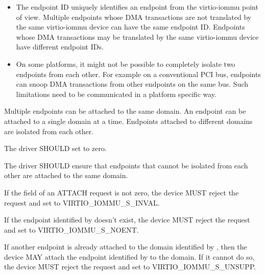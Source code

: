 \begin{itemize}
\item The endpoint ID uniquely identifies an endpoint from the
  virtio-iommu point of view. Multiple endpoints whose DMA transactions
  are not translated by the same virtio-iommu device can have the same
  endpoint ID. Endpoints whose DMA transactions may be translated by the
  same virtio-iommu device have different endpoint IDs.

\item On some platforms, it might not be possible to completely isolate
  two endpoints from each other. For example on a conventional PCI bus,
  endpoints can snoop DMA transactions from other endpoints on the same
  bus. Such limitations need to be communicated in a platform specific
  way.
\end{itemize}

Multiple endpoints can be attached to the same domain. An endpoint can be
attached to a single domain at a time. Endpoints attached to different
domains are isolated from each other.


The driver SHOULD set  to zero.

The driver SHOULD ensure that endpoints that cannot be isolated from each
other are attached to the same domain.


If the  field of an ATTACH request is not zero, the device
MUST reject the request and set  to VIRTIO_IOMMU_S_INVAL.

If the endpoint identified by  doesn't exist, the device
MUST reject the request and set  to VIRTIO_IOMMU_S_NOENT.

If another endpoint is already attached to the domain identified by
, then the device MAY attach the endpoint identified by
 to the domain. If it cannot do so, the device MUST reject
the request and set  to VIRTIO_IOMMU_S_UNSUPP.

